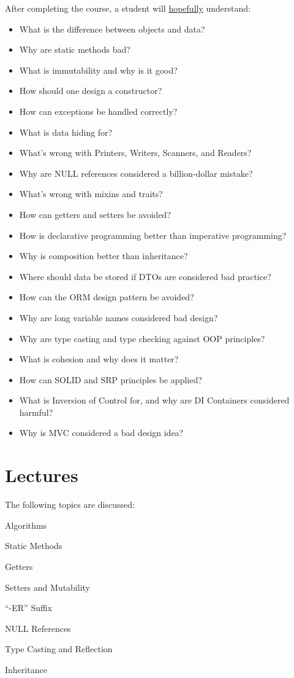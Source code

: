 \documentclass[nobrand,anonymous,nodate,nosecurity]{huawei}
\begin{document}
After completing the course, a student will \ul{hopefully} understand:

\begin{itemize}
\item What is the difference between objects and data?
\item Why are static methods bad?
\item What is immutability and why is it good?
\item How should one design a constructor?
\item How can exceptions be handled correctly?
\item What is data hiding for?
\item What's wrong with Printers, Writers, Scanners, and Readers?
\item Why are NULL references considered a billion-dollar mistake?
\item What's wrong with mixins and traits?
\item How can getters and setters be avoided?
\item How is declarative programming better than imperative programming?
\item Why is composition better than inheritance?
\item Where should data be stored if DTOs are considered bad practice?
\item How can the ORM design pattern be avoided?
\item Why are long variable names considered bad design?
\item Why are type casting and type checking against OOP principles?
\item What is cohesion and why does it matter?
\item How can SOLID and SRP principles be applied?
\item What is Inversion of Control for, and why are DI Containers considered harmful?
\item Why is MVC considered a bad design idea?
\end{itemize}

\newpage
\section*{Lectures}

The following topics are discussed:

\begin{lectures}
\item Algorithms
\item Static Methods
\item Getters
\item Setters and Mutability
\item ``-ER'' Suffix
\item NULL References
\item Type Casting and Reflection
\item Inheritance
\end{lectures}
\end{document}
